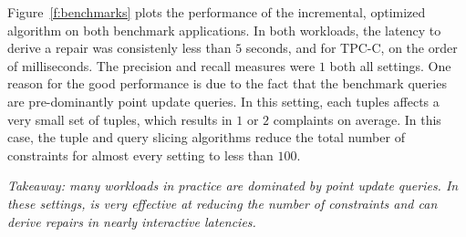 Figure~\ref{f:benchmarks} plots the performance of the incremental, optimized \sys algorithm
on both benchmark applications.  In both workloads, the latency to derive a repair was consistenly less
than $5$ seconds, and for TPC-C, on the order of milliseconds.  The precision and recall measures were
$1$ both all settings.   One reason for the good performance is due to the fact that the benchmark queries
are pre-dominantly point update queries.  In this setting, each tuples affects a very small set of 
tuples, which results in $1$ or $2$ complaints on average.  In this case, the tuple and query slicing algorithms
reduce the total number of constraints for almost every setting to less than $100$.  

{\it Takeaway: many workloads in practice are dominated by point update queries.  In these settings,
 \sys is very effective at reducing the number of constraints and can derive repairs in nearly
 interactive latencies.}






